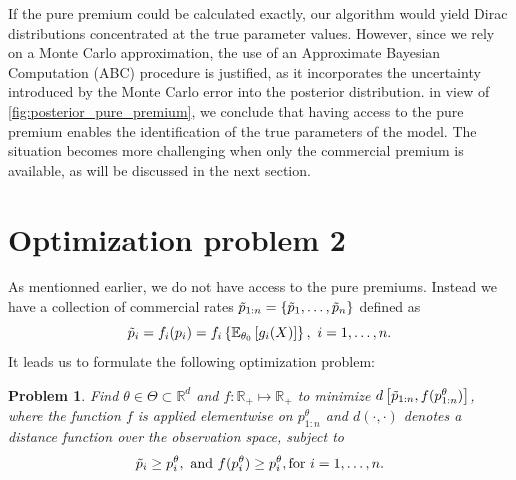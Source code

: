 \documentclass[10pt]{article}
\newtheorem{pb}{Problem}
\begin{document}
If the pure premium could be calculated exactly, our algorithm would yield Dirac distributions concentrated at the true parameter values. However, since we rely on a Monte Carlo approximation, the use of an Approximate Bayesian Computation (ABC) procedure is justified, as it incorporates the uncertainty introduced by the Monte Carlo error into the posterior distribution. in view of \cref{fig:posterior_pure_premium}, we conclude that having access to the pure premium enables the identification of the true parameters of the model. The situation becomes more challenging when only the commercial premium is available, as will be discussed in the next section.

\section{Optimization problem 2}\label{sec:problem2}

As mentionned earlier, we do not have access to the pure premiums. Instead we have a collection of commercial rates $\Tilde{p}_{1:n} = \{\Tilde{p}_{1},\ldots, \Tilde{p}_{n}\}$ defined as
$$
\Tilde{p}_i = f_i(p_i) = f_i\left\{\mathbb{E}_{\theta_0}\left[g_{i}(X)\right]\right\},\text{ }i = 1,\ldots, n.
$$
It leads us to formulate the following optimization problem: 
\begin{pb}\label{pb:optimization_problem}
Find $\theta\in \Theta\subset\mathbb{R}^d$ and $f:\mathbb{R}_+\mapsto \mathbb{R}_+$ to minimize \(d\left[\Tilde{p}_{1:n}, f(p_{1:n}^\theta)\right]\), where the function $f$ is applied elementwise on $p_{1:n}^\theta$ and $d(\cdot, \cdot)$ denotes a distance function over the observation space, subject to 
\begin{equation}\label{eq:constraint}
\Tilde{p}_i \geq p_i^\theta,\text{ and } f(p_i^\theta) \geq p_i^\theta, \text{for }i = 1,\ldots, n.
\end{equation} 
\end{pb}
\end{document}
